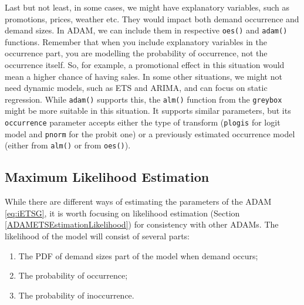 \documentclass[
]{book}
\providecommand{\tightlist}{%
  \setlength{\itemsep}{0pt}\setlength{\parskip}{0pt}}
\theoremstyle{definition}
\theoremstyle{definition}
\theoremstyle{definition}
\theoremstyle{definition}
\theoremstyle{remark}
\begin{document}
Last but not least, in some cases, we might have explanatory variables, such as promotions, prices, weather etc. They would impact both demand occurrence and demand sizes. In ADAM, we can include them in respective \texttt{oes()} and \texttt{adam()} functions. Remember that when you include explanatory variables in the occurrence part, you are modelling the probability of occurrence, not the occurrence itself. So, for example, a promotional effect in this situation would mean a higher chance of having sales. In some other situations, we might not need dynamic models, such as ETS and ARIMA, and can focus on static regression. While \texttt{adam()} supports this, the \texttt{alm()} function from the \texttt{greybox} might be more suitable in this situation. It supports similar parameters, but its \texttt{occurrence} parameter accepts either the type of transform (\texttt{plogis} for logit model and \texttt{pnorm} for the probit one) or a previously estimated occurrence model (either from \texttt{alm()} or from \texttt{oes()}).

\hypertarget{iETSMLE}{%
\subsection{Maximum Likelihood Estimation}\label{iETSMLE}}

While there are different ways of estimating the parameters of the ADAM \eqref{eq:iETSG}, it is worth focusing on likelihood estimation (Section \ref{ADAMETSEstimationLikelihood}) for consistency with other ADAMs. The likelihood of the model will consist of several parts:

\begin{enumerate}
\def\labelenumi{\arabic{enumi}.}
\tightlist
\item
  The PDF of demand sizes part of the model when demand occurs;
\item
  The probability of occurrence;
\item
  The probability of inoccurrence.
\end{enumerate}
\end{document}
